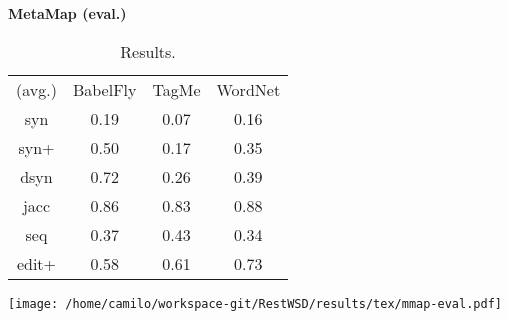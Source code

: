 \begin{center}\textbf{\Large MetaMap (eval.)}\end{center}
\begin{center}\begin{table}[p]\centering
\begin{tabular}{cccc}
(avg.) & BabelFly & TagMe & WordNet\\ 
syn & 0.19 & 0.07 & 0.16\\ 
syn+ & 0.50 & 0.17 & 0.35\\ 
dsyn & 0.72 & 0.26 & 0.39\\ 
jacc & 0.86 & 0.83 & 0.88\\ 
seq & 0.37 & 0.43 & 0.34\\ 
edit+ & 0.58 & 0.61 & 0.73
\end{tabular}\caption{Results.}\end{table}\end{center}



\vspace{0.2cm}

\begin{center}
\texttt{[image: /home/camilo/workspace-git/RestWSD/results/tex/mmap-eval.pdf]}
\end{center}
\newpage
